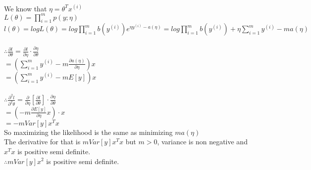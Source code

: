 \begin{answer}\\
We know that $\eta=\theta^T x^{(i)}$\\
$L(\theta)=\prod_{i=1}^{m} p(y;\eta)$\\
$l(\theta)=log L(\theta)=log \prod_{i=1}^{m}b(y^{(i)})e^{\eta y^{(i)}-a(\eta)}=log \prod_{i=1}^{m} b(y^{(i)}) + \eta \sum_{i=1}^{m}y^{(i)} -m a(\eta)$\\\\
$\therefore \frac{\partial l}{\partial \theta}=\frac{\partial l}{\partial \eta}\cdot \frac{\partial \eta}{\partial \theta}$\\
$=(\sum_{i=1}^{m}y^{(i)} - m \frac{\partial a(\eta)}{\partial \eta})x$\\
$=(\sum_{i=1}^{m}y^{(i)} - m E[y])x$\\\\
$\therefore \frac{\partial^2 l}{\partial^2 \theta}=\frac{\partial}{\partial \eta}[\frac{\partial l}{\partial \theta}] \cdot \frac{\partial \eta}{\partial \theta}$\\
$=(-m \frac{\partial E[y]}{\partial \eta}x)\cdot x$\\
$=-m Var[y] x^Tx$\\
So maximizing the likelihood is the same as minimizing $m a(\eta)$\\
The derivative for that is $m Var[y] x^Tx$ but $m >0$, variance is non negative and $x^Tx$ is positive semi definite.\\
$\therefore m Var[y] x^2$ is positive semi definite.
\end{answer}
